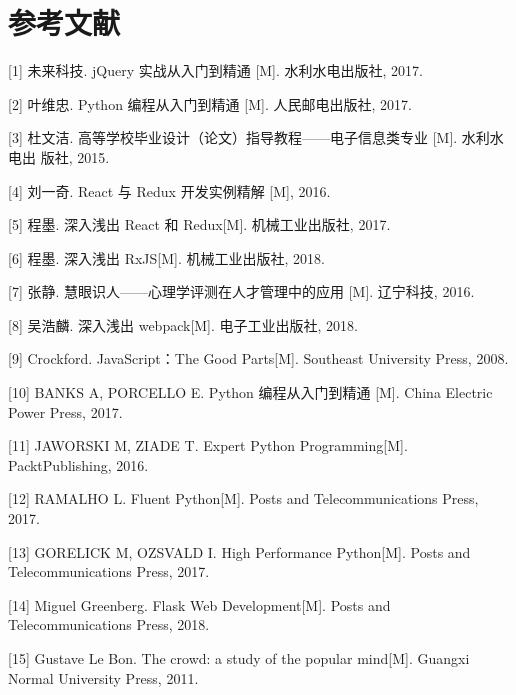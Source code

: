 \section*{参考文献}

[1] 未来科技. jQuery 实战从入门到精通 [M]. 水利水电出版社, 2017. 

[2] 叶维忠. Python 编程从入门到精通 [M]. 人民邮电出版社, 2017. 

[3] 杜文洁. 高等学校毕业设计（论文）指导教程——电子信息类专业 [M]. 水利水电出 版社, 2015. 

[4] 刘一奇. React 与 Redux 开发实例精解 [M], 2016. 

[5] 程墨. 深入浅出 React 和 Redux[M]. 机械工业出版社, 2017. 

[6] 程墨. 深入浅出 RxJS[M]. 机械工业出版社, 2018. 

[7] 张静. 慧眼识人——心理学评测在人才管理中的应用 [M]. 辽宁科技, 2016.

[8] 吴浩麟. 深入浅出 webpack[M]. 电子工业出版社, 2018. 

[9] Crockford. JavaScript：The Good Parts[M]. Southeast University Press, 2008. 

[10] BANKS A, PORCELLO E. Python 编程从入门到精通 [M]. China Electric Power Press, 2017. 

[11] JAWORSKI M, ZIADE T. Expert Python Programming[M]. PacktPublishing, 2016. 

[12] RAMALHO L. Fluent Python[M]. Posts and Telecommunications Press, 2017. 

[13] GORELICK M, OZSVALD I. High Performance Python[M]. Posts and Telecommunications Press, 2017. 

[14] Miguel Greenberg. Flask Web Development[M]. Posts and Telecommunications Press, 2018. 

[15] Gustave Le Bon. The crowd: a study of the popular mind[M]. Guangxi Normal University Press, 2011.